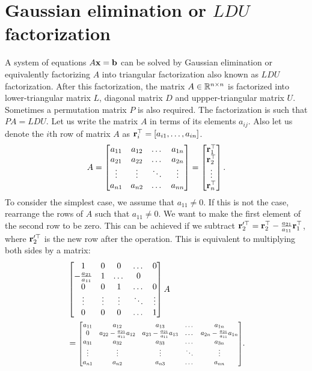 \documentclass{article}
\begin{document}
\section{Gaussian elimination or  $LDU$  factorization}
A system  of  equations   $A\mathbf{x} =  \mathbf{b}$  can  be  solved by  Gaussian
elimination or   equivalently factorizing   $A$  into  triangular
factorization    also   known  as   $LDU$  factorization. After  this
factorization, the  matrix $A \in  \mathbb{R}^{n \times n}$ is factorized into
lower-triangular matrix $L$, diagonal matrix $D$ and  uppper-triangular   matrix
$U$. Sometimes a permutation matrix $P$  is  also required. The  factorization
is  such  that   $PA = LDU$.
Let  us   write  the  matrix   $A$ in   terms   of   its    elements  $a_{ij}$.
Also let  us   denote the $i$th    row of matrix $A$  as $\mathbf{r}_i^\top   =   [a_{i1},
\dots,   a_{in}]$.
\begin{align}
  A   =  \begin{bmatrix}
    a_{11} & a_{12}  &   \dots &  a_{1n} \\
    a_{21} & a_{22}  &   \dots &  a_{2n} \\
    \vdots &  \vdots  & \ddots & \vdots \\
    a_{n1} & a_{n2}  &   \dots &  a_{nn}
    \end{bmatrix}  =  \begin{bmatrix}  \mathbf{r}_1^\top  \\  \mathbf{r}_2^\top \\ \vdots \\ \mathbf{r}_n^\top\end{bmatrix}.
\end{align}
To consider  the  simplest  case, we   assume that $a_{11}
\ne 0$.  If  this is not the case, rearrange the rows of $A$ such that $a_{11}
\ne 0$. We want  to make the first element of  the second row to  be zero. This  can  be achieved if  we subtract $\mathbf{r}'^\top_2 =  \mathbf{r}_2^\top -
\frac{a_{21}}{a_{11}}   \mathbf{r}_1^\top$, where $\mathbf{r}'^\top_2$ is  the  new  row
after the  operation. This is  equivalent to multiplying both sides
by a  matrix:
\begin{align*}
 &\begin{bmatrix} 1  & 0  &  0 &  \dots  & 0 \\
  -\frac{a_{21}}{a_{11}} & 1  & \dots  &   0  \\
  0 & 0  & 1 & \dots  &   0  \\
  \vdots  & \vdots &  \vdots  &   \ddots  &  \vdots   \\
  0 & 0 &  0   &  \dots  & 1
\end{bmatrix}A  \\
&=  \scalebox{0.8}{\mbox{$\begin{bmatrix}
  a_{11} & a_{12}  &  a_{13} &     \dots &  a_{1n} \\
  0 & a_{22}-\frac{a_{21}}{a_{11}}a_{12}  & a_{23}-\frac{a_{21}}{a_{11}}a_{13} &  \dots &  a_{2n} -\frac{a_{21}}{a_{11}}a_{1n}\\
  a_{31} & a_{32}  &  a_{33} &     \dots &  a_{3n} \\
  \vdots &  \vdots  & \vdots &  \ddots & \vdots \\
  a_{n1} & a_{n2}  &  a_{n3} &   \dots &  a_{nn}
\end{bmatrix}$}}.
\end{align*}
\end{document}
